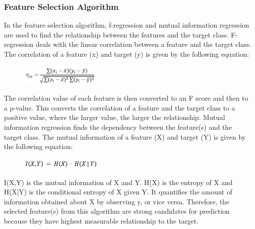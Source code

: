 \documentclass[conference]{IEEEtran}
\begin{document}
\subsubsection{Feature Selection Algorithm}
In the feature selection algorithm, f-regression and mutual information regression are used to find the relationship between the features and the target class. F-regression deals with the linear correlation between a feature and the target class. The correlation of a feature (x) and target (y) is given by the following equation:
\begin{center}
    \begin{figure}[H]
        \centering
        \includegraphics[width=4cm]{correlationeq.PNG}
    \end{figure}
\end{center}
The correlation value of each feature is then converted to an F score and then to a p-value. This converts the correlation of a feature and the target class to a positive value, where the larger value, the larger the relationship. Mutual information regression finds the dependency between the feature(s) and the target class. The mutual information of a feature (X) and target (Y) is given by the following equation:
\begin{center}
    \begin{figure}[H]
        \centering
        \includegraphics[width=4cm]{mutualinfoeq.PNG}
    \end{figure}
\end{center}
I(X,Y) is the mutual information of X and Y. H(X) is the entropy of X and H(X|Y) is the conditional entropy of X given Y. It quantifies the amount of information obtained about X by observing y, or vice versa. Therefore, the selected feature(s) from this algorithm are strong candidates for prediction because they have highest measurable relationship to the target.
\end{document}
